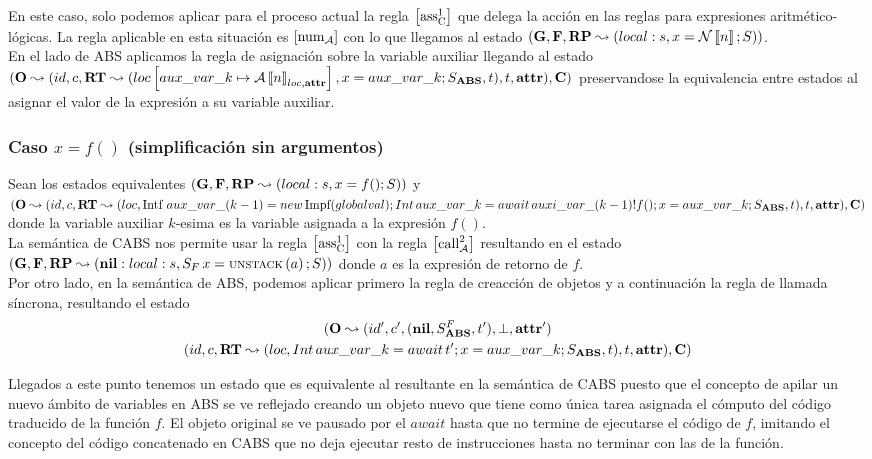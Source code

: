 En este caso, solo podemos aplicar para el proceso actual la regla $\left[ \text{ass}_{\text{C}}^{1} \right]$ que delega la acción en las reglas para expresiones aritmético-lógicas. La regla aplicable en esta situación es $\left[ \text{num}_{\mathcal{A}} \right]$ con lo que llegamos al estado $(\mathbf{G}, \mathbf{F}, \textbf{RP} \leadsto (local:s,x = \mathcal{N}\left\llbracket n \right\rrbracket\mbox{;\,}S))$.\\

En el lado de ABS aplicamos la regla de asignación sobre la variable auxiliar llegando al estado $(\mathbf{O} \leadsto (id, c, \textbf{RT} \leadsto (loc \left[ aux\_var\_k\mapsto\mathcal{A} \left\llbracket n \right\rrbracket_{loc, \textbf{attr}} \right], x = aux\_var\_k\mbox{;\,}S_{\textbf{ABS}}, t), t, \textbf{attr}), \mathbf{C})$ preservandose la equivalencia entre estados al asignar el valor de la expresión a su variable auxiliar.

\subsubsection{Caso $x = f()$ (simplificación sin argumentos)}
Sean los estados equivalentes $(\mathbf{G}, \mathbf{F}, \textbf{RP} \leadsto (local:s,x = f()\mbox{;\,}S))$ y $(\mathbf{O} \leadsto (id, c, \textbf{RT} \leadsto (loc, \mbox{Intf }  aux\_var\_(k-1) = new\, \mbox{Impf}(globalval) \mbox{;\,} Int\, aux\_var\_k = await\,auxi\_var\_(k-1)!f()\mbox{;\,} x = aux\_var\_k\mbox{;\,} S_{\textbf{ABS}}, t), t, \textbf{attr}), \mathbf{C})$ donde la variable auxiliar $k$-esima es la variable asignada a la expresión $f()$.\\

La semántica de CABS nos permite usar la regla $\left[ \text{ass}_{\text{C}}^{1} \right]$ con la regla $\left[ \text{call}_{\mathcal{A}}^2 \right]$ resultando en el estado $(\mathbf{G}, \mathbf{F}, \textbf{RP} \leadsto (\textbf{nil}:local:s, S_F\,x = \text{\scriptsize{UNSTACK}}\left(a\right)\mbox{;\,}S))$ donde $a$ es la expresión de retorno de $f$.\\

Por otro lado, en la semántica de ABS, podemos aplicar primero la regla de creacción de objetos y a continuación la regla de llamada síncrona, resultando el estado
\begin{multline*}
  (\mathbf{O} \leadsto (id', c', (\textbf{nil}, S_{\textbf{ABS}}^F, t'), \perp, \textbf{attr}')\\
  (id, c, \textbf{RT} \leadsto (loc, Int\, aux\_var\_k = await\,t'\mbox{;\,} x = aux\_var\_k\mbox{;\,} S_{\textbf{ABS}}, t), t, \textbf{attr}), \mathbf{C})
\end{multline*}

Llegados a este punto tenemos un estado que es equivalente al resultante en la semántica de CABS puesto que el concepto de apilar un nuevo ámbito de variables en ABS se ve reflejado creando un objeto nuevo que tiene como única tarea asignada el cómputo del código traducido de la función $f$. El objeto original se ve pausado por el $await$ hasta que no termine de ejecutarse el código de $f$, imitando el concepto del código concatenado en CABS que no deja ejecutar resto de instrucciones hasta no terminar con las de la función.\\

